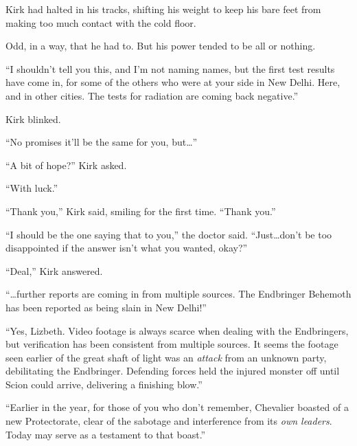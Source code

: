 Kirk had halted in his tracks, shifting his weight to keep his bare feet from making too much contact with the cold floor.



Odd, in a way, that he had to.  But his power tended to be all or nothing.



``I shouldn't tell you this, and I'm not naming names, but the first test results have come in, for some of the others who were at your side in New Delhi.  Here, and in other cities.  The tests for radiation are coming back negative.''



Kirk blinked.



``No promises it'll be the same for you, but\ldots''



``A bit of hope?'' Kirk asked.



``With luck.''



``Thank you,'' Kirk said, smiling for the first time.  ``Thank you.''



``I should be the one saying that to you,'' the doctor said.  ``Just\ldots don't be too disappointed if the answer isn't what you wanted, okay?''



``Deal,'' Kirk answered.



\sectionbreak



``\ldots{}further reports are coming in from multiple sources.  The Endbringer Behemoth has been reported as being slain in New Delhi!''



``Yes, Lizbeth.  Video footage is always scarce when dealing with the Endbringers, but verification has been consistent from multiple sources.  It seems the footage seen earlier of the great shaft of light was an \emph{attack} from an unknown party, debilitating the Endbringer.  Defending forces held the injured monster off until Scion could arrive, delivering a finishing blow.''



``Earlier in the year, for those of you who don't remember, Chevalier boasted of a new Protectorate, clear of the sabotage and interference from its \emph{own leaders}.  Today may serve as a testament to that boast.''



